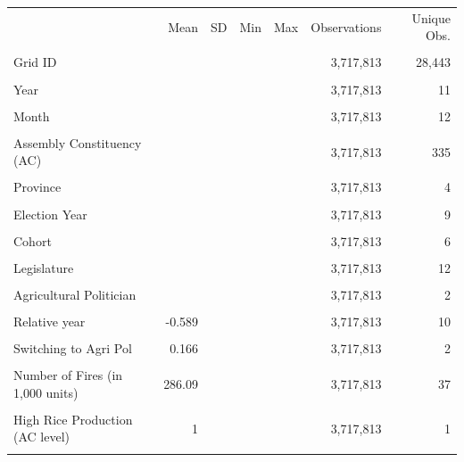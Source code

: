 \begin{tabular}{lrrrrrr}
\toprule
 & Mean & SD & Min & Max & Observations & Unique Obs.\\\\
\midrule
Grid ID &  &  &  &  & 3,717,813 & 28,443\\\\
Year &  &  &  &  & 3,717,813 & 11\\\\
Month &  &  &  &  & 3,717,813 & 12\\\\
Assembly Constituency (AC) &  &  &  &  & 3,717,813 & 335\\\\
Province &  &  &  &  & 3,717,813 & 4\\\\
Election Year &  &  &  &  & 3,717,813 & 9\\\\
Cohort &  &  &  &  & 3,717,813 & 6\\\\
Legislature &  &  &  &  & 3,717,813 & 12\\\\
Agricultural Politician &  &  &  &  & 3,717,813 & 2\\\\
Relative year & -0.589 &  &  &  & 3,717,813 & 10\\\\
Switching to Agri Pol & 0.166 &  &  &  & 3,717,813 & 2\\\\
Number of Fires (in 1,000 units) & 286.09 &  &  &  & 3,717,813 & 37\\\\
High Rice Production (AC level) & 1 &  &  &  & 3,717,813 & 1\\\\
\bottomrule
\end{tabular}
